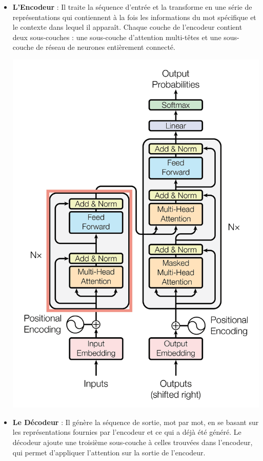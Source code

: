 \documentclass[
  letterpaper,
  DIV=11,
  numbers=noendperiod]{scrreprt}
\begin{document}
\begin{itemize}
\item
  \textbf{L'Encodeur} : Il traite la séquence d'entrée et la transforme
  en une série de représentations qui contiennent à la fois les
  informations du mot spécifique et le contexte dans lequel il apparaît.
  Chaque couche de l'encodeur contient deux sous-couches : une
  sous-couche d'attention multi-têtes et une sous-couche de réseau de
  neurones entièrement connecté.

  \includegraphics{images/transformer_1.png}
\item
  \textbf{Le Décodeur} : Il génère la séquence de sortie, mot par mot,
  en se basant sur les représentations fournies par l'encodeur et ce qui
  a déjà été généré. Le décodeur ajoute une troisième sous-couche à
  celles trouvées dans l'encodeur, qui permet d'appliquer l'attention
  sur la sortie de l'encodeur.


\end{itemize}
\end{document}
